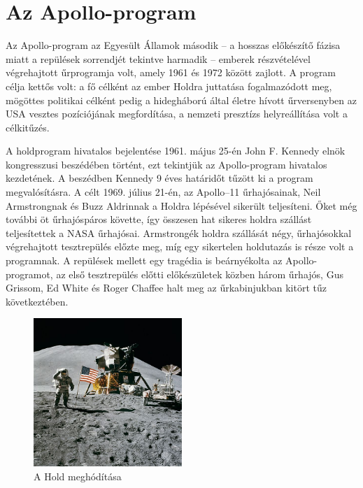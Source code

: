 \documentclass[12pt]{article}
\begin{document}



\tableofcontents\vfill


\section{Az Apollo-program}

Az Apollo-program az Egyesült Államok második – a hosszas előkészítő fázisa miatt a repülések sorrendjét tekintve harmadik – emberek részvételével végrehajtott űrprogramja volt, amely 1961 és 1972 között zajlott. A program célja kettős volt: a fő célként az ember Holdra juttatása fogalmazódott meg, mögöttes politikai célként pedig a hidegháború által életre hívott űrversenyben az USA vesztes pozíciójának megfordítása, a nemzeti presztízs helyreállítása volt a célkitűzés.

A holdprogram hivatalos bejelentése 1961. május 25-én John F. Kennedy elnök kongresszusi beszédében történt, ezt tekintjük az Apollo-program hivatalos kezdetének. A beszédben Kennedy 9 éves határidőt tűzött ki a program megvalósításra. A célt 1969. július 21-én, az Apollo–11 űrhajósainak, Neil Armstrongnak és Buzz Aldrinnak a Holdra lépésével sikerült teljesíteni. Őket még további öt űrhajóspáros követte, így összesen hat sikeres holdra szállást teljesítettek a NASA űrhajósai. Armstrongék holdra szállását négy, űrhajósokkal végrehajtott tesztrepülés előzte meg, míg egy sikertelen holdutazás is része volt a programnak. A repülések mellett egy tragédia is beárnyékolta az Apollo-programot, az első tesztrepülés előtti előkészületek közben három űrhajós, Gus Grissom, Ed White és Roger Chaffee halt meg az űrkabinjukban kitört tűz következtében.

\begin{figure}[htb]
  \centering
  \includegraphics[width=0.5\textwidth]{images/foto}
  \caption{A Hold meghódítása}
  \label{fig:foto}
\end{figure}
\end{document}
